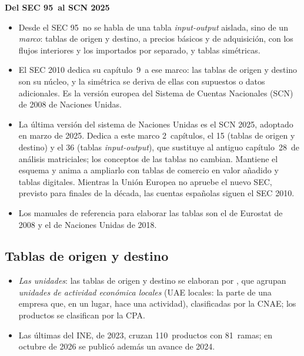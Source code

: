 \documentclass[11pt]{article}
\begin{document}
\begin{anotaciones}
\textbf{Del SEC 95~al SCN 2025}
\begin{itemize}
\item Desde el SEC 95~no se habla de una tabla \emph{input-output} aislada, sino de un \emph{marco}: tablas de origen y destino, a precios básicos y de adquisición, con los flujos interiores y los importados por separado, y tablas simétricas.
\item El SEC 2010 dedica su capítulo~9~a ese marco: las tablas de origen y destino son su núcleo, y la simétrica se deriva de ellas con supuestos o datos adicionales\nocite{Eurostat2013SEC2010}. Es la versión europea del Sistema de Cuentas Nacionales (SCN) de 2008 de Naciones Unidas.
\item La última versión del sistema de Naciones Unidas es el SCN 2025, adoptado en marzo de 2025\nocite{ONU2025SCN}. Dedica a este marco 2~capítulos, el 15 (tablas de origen y destino) y el 36 (tablas \emph{input-output}), que sustituye al antiguo capítulo~28~de análisis matriciales; los conceptos de las tablas no cambian\nocite{ONU2025SCNCapitulos}. Mantiene el esquema y anima a ampliarlo con tablas de comercio en valor añadido y tablas digitales. Mientras la Unión Europea no apruebe el nuevo SEC, previsto para finales de la década\nocite{BCE2026CalidadBP}, las cuentas españolas siguen el SEC 2010.
\item Los manuales de referencia para elaborar las tablas son el de Eurostat de 2008 y el de Naciones Unidas de 2018\nocite{Eurostat2008Manual,ONU2018ManualTOD}.
\end{itemize}
\end{anotaciones}

\subsection{Tablas de origen y destino}\label{sec:origen-destino}

\begin{itemize}
\item \emph{Las unidades}: las tablas de origen y destino se elaboran por , que agrupan \emph{unidades de actividad económica locales} (UAE locales: la parte de una empresa que, en un lugar, hace una actividad), clasificadas por la CNAE; los productos se clasifican por la CPA\nocite{Eurostat2013SEC2010}.
\item Las últimas del INE, de 2023, cruzan 110~productos con 81~ramas; en octubre de 2026 se publicó además un avance de 2024\nocite{INE2026TOD}.
\end{itemize}
\end{document}
